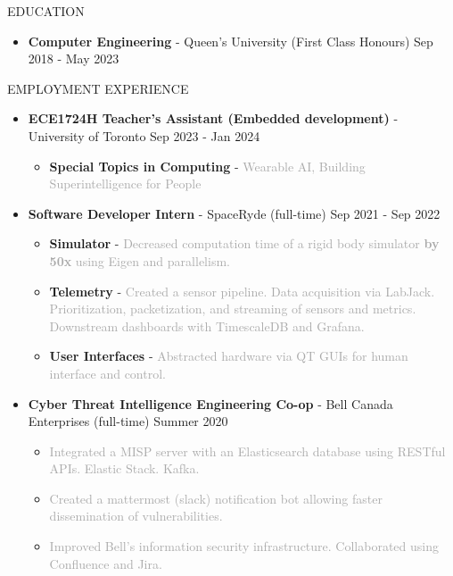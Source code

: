 \documentclass{resume} %
\begin{document}
\begin{rSection}{EDUCATION}
    \begin{itemize}
        \item {\bf Computer Engineering} - Queen's University (First Class Honours) \hfill {Sep 2018 - May 2023}
    \end{itemize}
\end{rSection}

\begin{rSection}{EMPLOYMENT EXPERIENCE}
    \begin{itemize}
        \item {\bf ECE1724H Teacher's Assistant (Embedded development)} - University of Toronto \hfill {Sep 2023 - Jan 2024}
        \begin{itemize}[topsep=-10pt]
            \setlength\itemsep{-0.5em}
                \item[\textbullet] {\bf Special Topics in Computing} - \textcolor{darkgray}{Wearable AI, Building Superintelligence for People}
            \end{itemize}
        \item {\bf Software Developer Intern} - SpaceRyde (full-time) \hfill {Sep 2021 - Sep 2022}
        \begin{itemize}[topsep=-10pt]
            \setlength\itemsep{-0.5em}
            \item[\textbullet] {\bf Simulator} - \textcolor{darkgray}{Decreased computation time of a rigid body simulator \textbf{by 50x} using Eigen and parallelism.}
            \item[\textbullet] {\bf Telemetry} - \textcolor{darkgray}{Created a sensor pipeline. Data acquisition via LabJack. Prioritization, packetization, and streaming of sensors and metrics. Downstream dashboards with TimescaleDB and Grafana.}
            \item[\textbullet] {\bf User Interfaces} - \textcolor{darkgray}{Abstracted hardware via QT GUIs for human interface and control.}
        \end{itemize}
        \item {\bf Cyber Threat Intelligence Engineering Co-op} - Bell Canada Enterprises (full-time) \hfill {Summer 2020}
        \begin{itemize}[topsep=-10pt]
            \setlength\itemsep{-0.5em}
            \item[\textbullet] \textcolor{darkgray}{Integrated a MISP server with an Elasticsearch database using RESTful APIs. Elastic Stack. Kafka.}
            \item[\textbullet] \textcolor{darkgray}{Created a mattermost (slack) notification bot allowing faster dissemination of vulnerabilities.}
            \item[\textbullet] \textcolor{darkgray}{Improved Bell's information security infrastructure. Collaborated using Confluence and Jira.}
        \end{itemize}
    \end{itemize}
\end{rSection}
\end{document}
